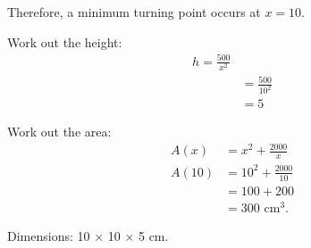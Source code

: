 \begin{enumerate}
	Therefore, a minimum turning point occurs at $x=10$.
	
	Work out the height:
	\begin{align*}
		h = \frac{500}{x^2}\\
		&= \frac{500}{10^2}\\
		&= 5
	\end{align*}
	
	Work out the area:
	\begin{align*}
		A(x) &= x^2+\frac{2000}{x}\\
		A(10) &= 10^2+\frac{2000}{10}\\
		&= 100+200\\
		&= 300\text{ cm}^3\text{.}
	\end{align*}
	
	Dimensions: 10 $\times$ 10 $\times$ 5 cm.
\end{enumerate}